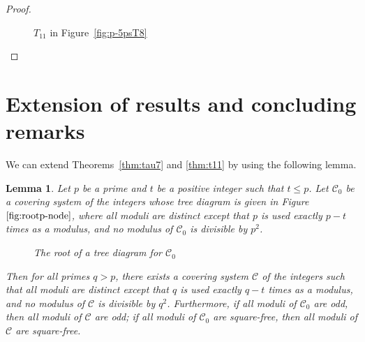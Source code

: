\documentclass[12pt]{article}
\newtheorem{lemma}[theorem]{Lemma}
\theoremstyle{definition}
\renewcommand{\i}{\textup{\textbf{i}}}
\renewcommand{\j}{\textup{\textbf{j}}}
\newcommand{\p}{\textup{\textbf{p}}}
\begin{document}
\begin{proof}
\begin{figure}[H]
\begin{minipage}{0.32\textwidth}
\centering
{}
\caption{$T_{11}$ in Figure~\ref{fig:p-5psT8}}
\label{fig:p-5psT11}
\end{minipage}
\end{figure}
\end{proof}




\section{Extension of results and concluding remarks}\label{sec:twolemmas}

We can extend Theorems~\ref{thm:tau7} and \ref{thm:t11} by using the following lemma.

\begin{lemma}\label{lem:squarefree}
Let $p$ be a prime and $t$ be a positive integer such that $t\leq p$. Let $\mathcal{C}_0$ be a covering system of the integers whose tree diagram is given in Figure~$\ref{fig:rootp-node}$, where all moduli are distinct except that $p$ is used exactly $p-t$
times as a modulus, and no modulus of $\mathcal{C}_0$ is divisible by $p^2$.
\begin{figure}[H]
\centering
{}
\caption{The root of a tree diagram for $\mathcal{C}_0$}
\label{fig:rootp-node}
\end{figure}
\noindent Then for all primes $q>p$, there exists a covering system $\mathcal{C}$ of the integers such that all moduli are distinct except that $q$ is used exactly $q-t$ times as a modulus, and no modulus of $\mathcal{C}$ is divisible by $q^2$. Furthermore, if all moduli of $\mathcal{C}_0$ are odd, then all moduli of $\mathcal{C}$ are odd; if all moduli of $\mathcal{C}_0$ are square-free, then all moduli of $\mathcal{C}$ are square-free.
\end{lemma}
\end{document}
